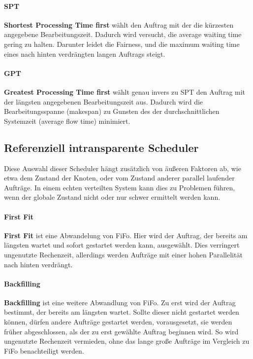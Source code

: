 \paragraph{SPT}
\textbf{Shortest Processing Time first} wählt den Auftrag mit der die kürzesten angegebene Bearbeitungszeit. Dadurch wird versucht, die average waiting time gering zu halten. Darunter leidet die Fairness, und die maximum waiting time eines nach hinten verdrängten langen Auftrags steigt.

\paragraph{GPT}
\textbf{Greatest Processing Time first} wählt genau invers zu SPT den Auftrag mit der längsten angegebenen Bearbeitungszeit aus. Dadurch wird die Bearbeitungsspanne (makespan) zu Gunsten des der durchschnittlichen Systemzeit (average flow time) minimiert.

\subsection{Referenziell intransparente Scheduler}
Diese Auswahl dieser Scheduler hängt zusätzlich von äußeren Faktoren ab, wie etwa dem Zustand der Knoten, oder vom Zustand anderer parallel laufender Aufträge. In einem echten verteilten System kann dies zu Problemen führen, wenn der globale Zustand nicht oder nur schwer ermittelt werden kann.

\paragraph{First Fit}
\textbf{First Fit} ist eine Abwandelung von FiFo. Hier wird  der Auftrag, der bereits am längsten wartet und sofort gestartet werden kann, ausgewählt. Dies verringert ungenutzte Rechenzeit, allerdings werden Aufträge mit einer hohen Parallelität nach hinten verdrängt.

\paragraph{Backfilling}
\textbf{Backfilling} ist eine weitere Abwandlung von FiFo. Zu erst wird der Auftrag bestimmt, der bereits am längsten wartet. Sollte dieser nicht gestartet werden können, dürfen andere Aufträge gestartet werden, vorausgesetzt, sie werden früher abgeschlossen, als der zu erst gewählte Auftrag beginnen wird. So wird ungenutzte Rechenzeit vermieden, ohne das lange große Aufträge im Vergleich zu FiFo benachteiligt werden.

